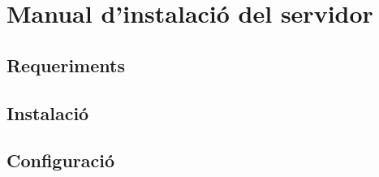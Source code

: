 \chapter{Manual d'instalació del servidor}\label{instalacio}

\section{Requeriments}

\section{Instalació}

\section{Configuració}
